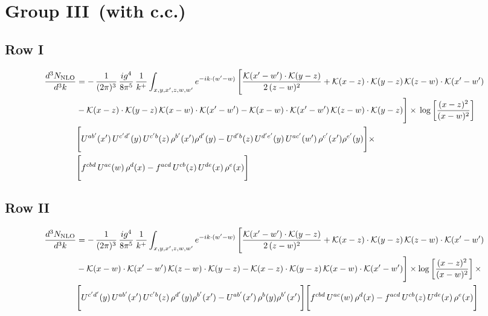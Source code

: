 \documentclass[9pt]{article}
\numberwithin{equation}{section}
\begin{document}
\section{Group III\, (with c.c.)}
\subsection{Row I}
\begin{align}
\frac{d^{3}N_{\rm NLO}}{d^{3}k} & = -\,\frac{1}{(2\pi)^{3}}\,\frac{ig^{4}}{8\pi^{5}}\,\frac{1}{k^{+}}\int_{x,y,x',z,w,w'} e^{-ik\cdot(w'-w)}\,\Bigg[\frac{\mathcal{K}(x'-w')\cdot\mathcal{K}(y-z)}{2\,(z-w)^{2}}+\mathcal{K}(x-z)\cdot\mathcal{K}(y-z)\,\mathcal{K}(z-w)\cdot\mathcal{K}(x'-w')\notag \\
& -\mathcal{K}(x-z)\cdot\mathcal{K}(y-z)\,\mathcal{K}(x-w)\cdot\mathcal{K}(x'-w')-\mathcal{K}(x-w)\cdot\mathcal{K}(x'-w')\,\mathcal{K}(z-w)\cdot\mathcal{K}(y-z)\Bigg]\times\, \log\left[\frac{(x-z)^{2}}{(x-w)^{2}}\right]\notag \\
& \Bigg[U^{ab'}(x')\,U^{c'd'}(y)\,U^{c'b}(z)\,\rho^{b'}(x')\rho^{d'}(y)-U^{d'b}(z)\,U^{d'e'}(y)\,U^{ac'}(w')\,\rho^{c'}(x')\rho^{e'}(y)\Bigg]\times\notag \\ & \Bigg[f^{cbd}\,U^{ac}(w)\,\rho^{d}(x)-f^{acd}\, U^{cb}(z)\,U^{de}(x)\,\rho^{e}(x)\Bigg]
\end{align}
\subsection{Row II}
\begin{align}
\frac{d^{3}N_{\rm NLO}}{d^{3}k} & = -\,\frac{1}{(2\pi)^{3}}\,\frac{ig^{4}}{8\pi^{5}}\,\frac{1}{k^{+}}\int_{x,y,x',z,w,w'} e^{-ik\cdot(w'-w)}\,\Bigg[\frac{\mathcal{K}(x'-w')\cdot\mathcal{K}(y-z)}{2\,(z-w)^{2}} +\mathcal{K}(x-z)\cdot\mathcal{K}(y-z)\,\mathcal{K}(z-w)\cdot\mathcal{K}(x'-w')\notag \\ & -\mathcal{K}(x-w)\cdot\mathcal{K}(x'-w')\,\mathcal{K}(z-w)\cdot\mathcal{K}(y-z)-\mathcal{K}(x-z)\cdot\mathcal{K}(y-z)\,\mathcal{K}(x-w)\cdot\mathcal{K}(x'-w')\Bigg]\times\log\left[\frac{(x-z)^{2}}{(x-w)^{2}}\right]\times\notag \\
&\Bigg[U^{c'd'}(y)\,U^{ab'}(x')\,U^{c'b}(z)\,\rho^{d'}(y)\rho^{b'}(x')-U^{ab'}(x')\,\rho^{b}(y)\rho^{b'}(x')\Bigg]\Bigg[f^{cbd}\,U^{ac}(w)\,\rho^{d}(x)-f^{acd}\, U^{cb}(z)\,U^{de}(x)\,\rho^{e}(x)\Bigg]
\end{align}
\end{document}
